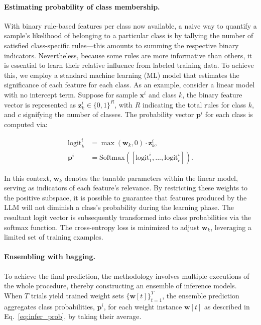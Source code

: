\vspace*{-0.12in}
\paragraph{Estimating probability of class membership.} With binary rule-based features per class now available, a naive way to quantify a sample's likelihood of belonging to a particular class is by tallying the number of satisfied class-specific rules—this amounts to summing the respective binary indicators. Nevertheless, because some rules are more informative than others, it is essential to learn their relative influence from labeled training data. To achieve this, we employ a standard machine learning (ML) model that estimates the significance of each feature for each class. As an example, consider a linear model with no intercept term. Suppose for sample $\mathbf{x}^i$ and class $k$, the binary feature vector is represented as $\mathbf{z}_k^i \in \{0, 1\}^R$, with $R$ indicating the total rules for class $k$, and $c$ signifying the number of classes. The probability vector $\mathbf{p}^i$ for each class is computed via:

\begin{align}
\text{logit}_k^i &= \max(\mathbf{w}_k, 0) \cdot \mathbf{z}_k^i, \nonumber \\
\mathbf{p}^i &= \text{Softmax}({[\text{logit}_{1}^i, ..., \text{logit}_{c}^i]}). \label{eq:infer_prob}
\end{align}

In this context, $\mathbf{w}_k$ denotes the tunable parameters within the linear model, serving as indicators of each feature's relevance. By restricting these weights to the positive subspace, it is possible to guarantee that features produced by the LLM will not diminish a class’s probability during the learning phase. The resultant logit vector is subsequently transformed into class probabilities via the softmax function. The cross-entropy loss is minimized to adjust $\mathbf{w}_k$, leveraging a limited set of training examples.

\vspace*{-0.12in}
\paragraph{Ensembling with bagging.} To achieve the final prediction, the methodology involves multiple executions of the whole procedure, thereby constructing an ensemble of inference models. When $T$ trials yield trained weight sets $\{\mathbf{w}[t]\}_{t=1}^T$, the ensemble prediction aggregates class probabilities, $\mathbf{p}^i$, for each weight instance $\mathbf{w}[t]$ as described in Eq.~\ref{eq:infer_prob}, by taking their average.

